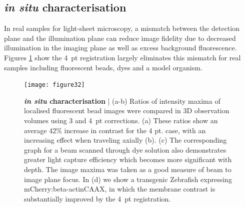 \subsection{\emph{in situ} characterisation}

In real samples for
light-sheet microscopy, %
a mismatch between the detection plane and the illumination plane %
can %
reduce image fidelity due to decreased illumination in the imaging plane as well as
excess background fluorescence.
Figures \ref{fig:3} show the 4~pt registration largely eliminates this %
mismatch for real samples including fluorescent beads, dyes and a model organism.

\begin{figure}[h]
  \texttt{[image: figure32]}
  \caption{\textbf{\emph{in situ} characterisation} |
  (a-b) Ratios of intensity maxima of localised fluorescent bead images
  were compared in 3D observation volumes %
  using 3 and 4~pt corrections.
  (a) These ratios show an %
  average 42\% increase in contrast for the 4 pt. case, %
  with an increasing effect when traveling axially (b).
  (c) The corresponding graph for a beam scanned through dye solution also demonstrates greater light capture efficiency which becomes more significant with depth.
  The image maxima was taken as a good measure of beam to image plane focus.
  In (d) we show a transgenic Zebrafish expressing mCherry:beta-actinCAAX, in which the membrane contrast is substantially improved by the 4~pt registration.%
  }
  \label{fig:3}
\end{figure}

